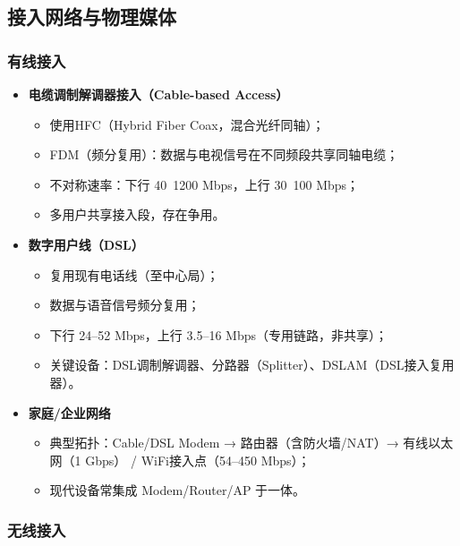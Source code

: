 \subsection{接入网络与物理媒体}

\subsubsection{有线接入}

\begin{itemize}
    \item \textbf{电缆调制解调器接入（Cable-based Access）}
          \begin{itemize}
              \item 使用HFC（Hybrid Fiber Coax，混合光纤同轴）；
              \item FDM（频分复用）：数据与电视信号在不同频段共享同轴电缆；
              \item 不对称速率：下行 40~1200 Mbps，上行 30~100 Mbps；
              \item 多用户共享接入段，存在争用。
          \end{itemize}

    \item \textbf{数字用户线（DSL）}
          \begin{itemize}
              \item 复用现有电话线（至中心局）；
              \item 数据与语音信号频分复用；
              \item 下行 24–52 Mbps，上行 3.5–16 Mbps（专用链路，非共享）；
              \item 关键设备：DSL调制解调器、分路器（Splitter）、DSLAM（DSL接入复用器）。
          \end{itemize}

    \item \textbf{家庭/企业网络}
          \begin{itemize}
              \item 典型拓扑：Cable/DSL Modem → 路由器（含防火墙/NAT）→ 有线以太网（1 Gbps） / WiFi接入点（54–450 Mbps）；
              \item 现代设备常集成 Modem/Router/AP 于一体。
          \end{itemize}
\end{itemize}

\subsubsection{无线接入}

